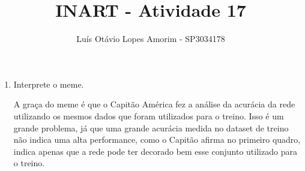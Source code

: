 \documentclass[a4paper, 12pt]{article}
\title{INART - Atividade 17}
\author{Luís Otávio Lopes Amorim - SP3034178}
\begin{document}
\maketitle
\begin{enumerate}
\item Interprete o meme.

 A graça do meme é que o Capitão América fez a análise da acurácia da rede utilizando os mesmos dados que foram utilizados para o treino. Isso é um grande problema, já que uma grande acurácia medida no dataset de treino não indica uma alta performance, como o Capitão afirma no primeiro quadro, indica apenas que a rede pode ter decorado bem esse conjunto utilizado para o treino.
\end{enumerate}
\end{document}
